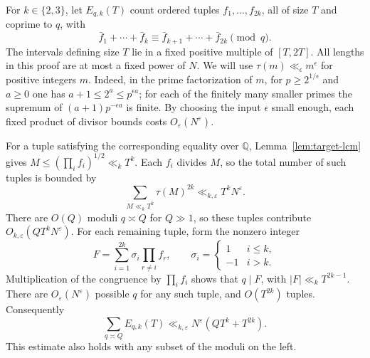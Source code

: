 \documentclass[11pt]{amsart}
\numberwithin{equation}{section}
\theoremstyle{remark}
\begin{document}
For \(k\in\{2,3\}\), let \(E_{q,k}(T)\) count ordered tuples
\(f_1,\ldots,f_{2k}\), all of size \(T\) and coprime to \(q\), with
\[
 \bar f_1+\cdots+\bar f_k
    \equiv \bar f_{k+1}+\cdots+\bar f_{2k}\pmod q .
\]
The intervals defining size \(T\) lie in a fixed positive multiple of
\([T,2T]\). All lengths in this proof are at most a fixed power of \(N\).
We will use \(\tau(m)\ll_\epsilon m^\epsilon\) for positive integers
\(m\). Indeed, in the prime factorization of \(m\), for
\(p\ge 2^{1/\epsilon}\) and \(a\ge0\) one has \(a+1\le 2^a\le
p^{\epsilon a}\); for each of the finitely many smaller primes the
supremum of \((a+1)p^{-\epsilon a}\) is finite. By choosing the input
\(\epsilon\) small enough, each fixed product of divisor bounds costs
\(O_\varepsilon(N^\varepsilon)\).

For a tuple satisfying the corresponding equality over \(\mathbb Q\),
Lemma~\ref{lem:target-lcm} gives
\(M\le(\prod_i f_i)^{1/2}\ll_k T^k\).
Each \(f_i\) divides \(M\), so the total number of such tuples is bounded
by
\[
 \sum_{M\ll_k T^k}\tau(M)^{2k}\ll_{k,\varepsilon}T^kN^\varepsilon .
\]
There are \(O(Q)\) moduli \(q\asymp Q\) for \(Q\gg 1\), so these tuples
contribute \(O_{k,\varepsilon}(QT^kN^\varepsilon)\).
For each remaining tuple, form the nonzero integer
\[
 F=\sum_{i=1}^{2k}\sigma_i\prod_{r\ne i} f_r,\qquad
 \sigma_i=
 \begin{cases}
   1&i\le k,\\
  -1&i>k .
 \end{cases}
\]
Multiplication of the congruence by \(\prod_i f_i\) shows that
\(q\mid F\), with \(\lvert F\rvert\ll_k T^{2k-1}\).
There are \(O_\varepsilon(N^\varepsilon)\) possible \(q\) for any such
tuple, and \(O(T^{2k})\) tuples. Consequently
\begin{equation}
 \sum_{q\asymp Q}E_{q,k}(T)
    \ll_{k,\varepsilon}N^\varepsilon(QT^k+T^{2k}).
 \label{eq:target-mean-energy}
\end{equation}
This estimate also holds with any subset of the moduli on the left.
\end{document}
